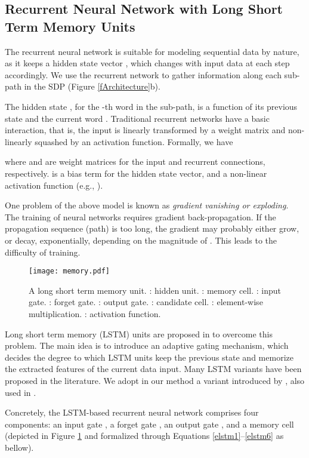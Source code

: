 \documentclass[11pt,a4paper]{article}
\begin{document}
\subsection{Recurrent Neural Network with Long Short Term Memory Units}\label{ssLSTM}

The recurrent neural network is suitable for modeling sequential data
by nature, as it keeps a hidden state vector , which changes with input
data at each step accordingly. We use the recurrent network to gather information
along each sub-path in the SDP (Figure \ref{fArchitecture}b).

The hidden state , for the -th word in the sub-path, is a function of its previous
state  and the current word .
Traditional recurrent networks have a basic interaction, that is, the input is linearly transformed by a weight matrix and non-linearly squashed by an activation function.
Formally, we have

where  and  are weight matrices for the input and
recurrent connections, respectively.
 is a bias term for the hidden state vector,
and  a non-linear activation function (e.g., ).

One problem of the above model is known as
\textit{gradient vanishing or exploding}.
The training of neural networks requires gradient back-propagation.
If the propagation sequence (path) is too long,
the gradient may probably either grow, or decay, exponentially,
depending on the magnitude of .
This leads to the difficulty of training.

\begin{figure}[!t]
\texttt{[image: memory.pdf]}
\caption{A long short term memory unit.
: hidden unit. : memory cell. : input gate.
: forget gate. : output gate.
: candidate cell. : element-wise multiplication.
: activation function.}\label{fLSTM}
\end{figure}


Long short term memory (LSTM) units are proposed in 
to overcome this problem. The main idea is to introduce an adaptive
gating mechanism,
which decides the degree to which LSTM units keep the previous state and
memorize the extracted features of the current data input.
Many LSTM variants have been proposed in the literature.
We adopt in our method a variant introduced by ,
also used in .

Concretely, the LSTM-based recurrent neural network
comprises four components: an input gate , a forget gate , an output gate , and a memory cell  (depicted in Figure \ref{fLSTM} and formalized through
Equations \ref{elstm1}--\ref{elstm6} as bellow).
\end{document}
